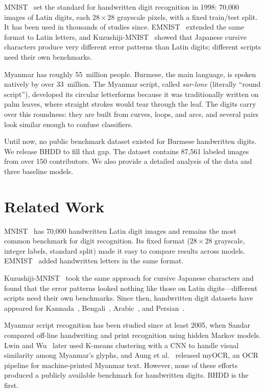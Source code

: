 \documentclass[conference]{IEEEtran}
\begin{document}
MNIST~\cite{lecun1998gradient} set the standard for handwritten digit
recognition in 1998: 70,000 images of Latin digits, each $28\times28$
grayscale pixels, with a fixed train/test split. It has been used in
thousands of studies since. EMNIST~\cite{cohen2017emnist} extended the
same format to Latin letters, and
Kuzushiji-MNIST~\cite{clanuwat2018deep} showed that Japanese cursive
characters produce very different error patterns than Latin
digits; different scripts need their own benchmarks.

Myanmar has roughly 55~million people. Burmese, the main language, is
spoken natively by over 33~million. The Myanmar script, called
\textit{sar-lone} (literally ``round script''), developed its circular
letterforms because it was traditionally written on palm
leaves, where straight strokes would tear through the leaf. The digits carry
over this roundness: they are built from curves, loops, and arcs, and
several pairs look similar enough to confuse classifiers.

Until now, no public benchmark dataset existed for Burmese handwritten
digits. We release BHDD to fill that gap. The dataset contains 87,561
labeled images from over 150 contributors. We also provide a detailed
analysis of the data and three baseline models.

\section{Related Work}

MNIST~\cite{lecun1998gradient} has 70,000 handwritten Latin digit images
and remains the most common benchmark for digit recognition. Its fixed
format ($28\times28$ grayscale, integer labels, standard split) made it
easy to compare results across models.
EMNIST~\cite{cohen2017emnist} added handwritten letters in the same
format.

Kuzushiji-MNIST~\cite{clanuwat2018deep} took the same approach for
cursive Japanese characters and found that the error patterns looked
nothing like those on Latin digits---different scripts need their own
benchmarks. Since then, handwritten digit datasets have appeared for
Kannada~\cite{prabhu2019kannada}, Bengali~\cite{alam2018numtadb},
Arabic~\cite{elsawy2017arabic}, and
Persian~\cite{khosravi2007hoda}.

Myanmar script recognition has been studied since at least 2005, when
Sandar~\cite{sandar2005comparison} compared off-line handwriting and
print recognition using hidden Markov models.
Lwin and Wu~\cite{lwin2020myanmar} later used K-means clustering with a
CNN to handle visual similarity among Myanmar's glyphs, and
Aung et al.~\cite{aung2024myocr} released myOCR, an OCR pipeline
for machine-printed Myanmar text. However, none of these efforts
produced a publicly available benchmark for handwritten digits.
BHDD is the first.
\end{document}
